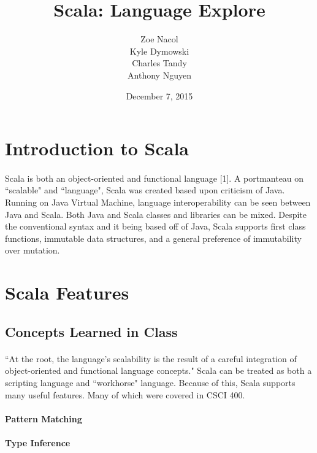 \documentclass[12pt]{article}
\begin{document}
\title{Scala: Language Explore}
\date{\footnotesize December 7, 2015}
\author{\footnotesize Zoe Nacol \\ \footnotesize Kyle Dymowski \\ \footnotesize Charles Tandy \\ \footnotesize Anthony Nguyen}
\maketitle

\section{Introduction to Scala}
	\paragraph{}Scala is both an object-oriented and functional language [1]. A portmanteau on ``scalable" and ``language", Scala was created based upon criticism of Java. Running on Java Virtual Machine, language interoperability can be seen between Java and Scala. Both Java and Scala classes and libraries can be mixed. Despite the conventional syntax and it being based off of Java, Scala supports first class functions, immutable data structures, and a general preference of immutability over mutation.
\section{Scala Features}
	\subsection{Concepts Learned in Class}
	\paragraph{}``At the root, the language's scalability is the result of a careful integration of object-oriented and functional language concepts." Scala can be treated as both a scripting language and ``workhorse" language. Because of this, Scala supports many useful features. Many of which were covered in CSCI 400.
		\paragraph{Pattern Matching}
		\paragraph{Type Inference}
\end{document}
